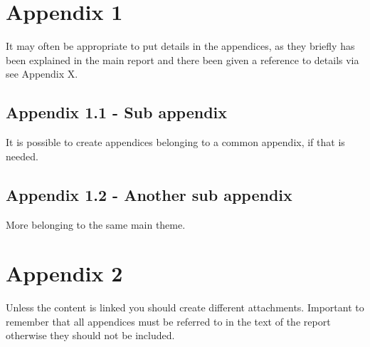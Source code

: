 \appendix

\chapter{Appendix 1} %
It may often be appropriate to put details in the appendices, as they briefly has been explained in the main report and there been given a reference to details via see Appendix X.

\begin{subappendices}

\section{Appendix 1.1 - Sub appendix}
It is possible to create appendices belonging to a common appendix, if that is needed.

\section{Appendix 1.2 - Another sub appendix}
More belonging to the same main theme.

\end{subappendices}

\chapter{Appendix 2}
Unless the content is linked you should create different attachments. Important to remember that all appendices must be referred to in the text of the report otherwise they should not be included.
